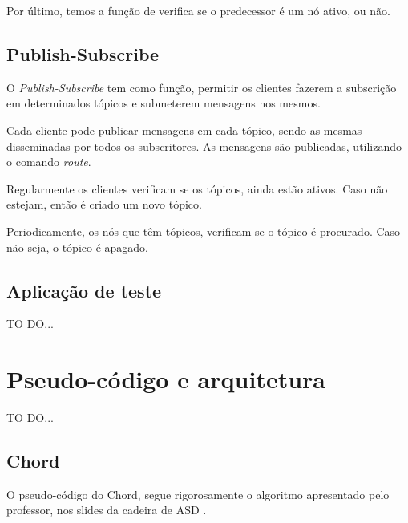\documentclass[12pt]{article}
\begin{document}
Por último, temos a função de verifica se o predecessor é um nó ativo, ou não.

\newpage
\subsection{Publish-Subscribe}

O \emph{Publish-Subscribe} tem como função, permitir os clientes fazerem a subscrição em determinados tópicos e submeterem mensagens nos mesmos.

Cada cliente pode publicar mensagens em cada tópico, sendo as mesmas disseminadas por todos os subscritores. As mensagens são publicadas, utilizando o comando \emph{route}.

Regularmente os clientes verificam se os tópicos, ainda estão ativos. Caso não estejam, então é criado um novo tópico.

Periodicamente, os nós que têm tópicos, verificam se o tópico é procurado. Caso não seja, o tópico é apagado.

\newpage
\subsection{Aplicação de teste}

TO DO...

\newpage
\section{Pseudo-código e arquitetura}

TO DO...

\newpage
\subsection{Chord}

O pseudo-código do Chord, segue rigorosamente o algoritmo apresentado pelo professor, nos slides da cadeira de ASD \cite{b1}.
\end{document}
